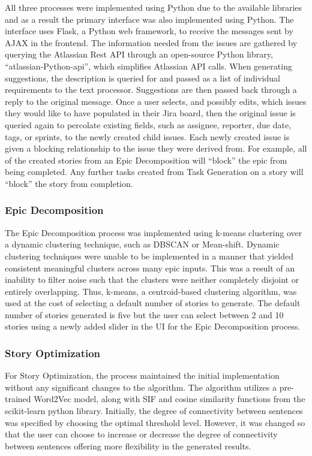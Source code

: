 All three processes were implemented using Python due to the available libraries and as a result the primary interface was also implemented using Python. The interface uses Flask, a Python web framework, to receive the messages sent by AJAX in the frontend. The information needed from the issues are gathered by querying the Atlassian Rest API through an open-source Python library, “atlassian-Python-api”, which simplifies Atlassian API calls. When generating suggestions, the description is queried for and passed as a list of individual requirements to the text processor. Suggestions are then passed back through a reply to the original message. Once a user selects, and possibly edits, which issues they would like to have populated in their Jira board, then the original issue is queried again to percolate existing fields, such as assignee, reporter, due date, tags, or sprints, to the newly created child issues. Each newly created issue is given a blocking relationship to the issue they were derived from. For example, all of the created stories from an Epic Decomposition will “block” the epic from being completed. Any further tasks created from Task Generation on a story will “block” the story from completion.

\subsubsection{Epic Decomposition}
The Epic Decomposition process was implemented using k-means clustering over a dynamic clustering technique, such as DBSCAN or Mean-shift. Dynamic clustering techniques were unable to be implemented in a manner that yielded consistent meaningful clusters across many epic inputs. This was a result of an inability to filter noise such that the clusters were neither completely disjoint or entirely overlapping. Thus, k-means, a centroid-based clustering algorithm, was used at the cost of selecting a default number of stories to generate. The default number of stories generated is five but the user can select between 2 and 10 stories using a newly added slider in the UI for the Epic Decomposition process.

\subsubsection{Story Optimization}
For Story Optimization, the process maintained the initial implementation without any significant changes to the algorithm. The algorithm utilizes a pre-trained Word2Vec model, along with SIF and cosine similarity functions from the scikit-learn python library. Initially, the degree of connectivity between sentences was specified by choosing the optimal threshold level. However, it was changed so that the user can choose to increase or decrease the degree of connectivity between sentences offering more flexibility in the generated results.

